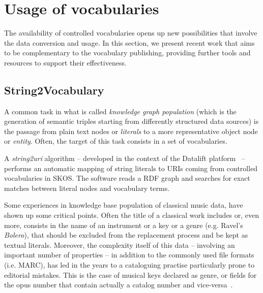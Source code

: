 \documentclass{article}
\begin{document}
\section{Usage of vocabularies}\label{sec:usage}
The availability of controlled vocabularies opens up new possibilities that involve the data conversion and usage. In this section, we present recent work that aims to be complementary to the vocabulary publishing, providing further tools and resources to support their effectiveness.

\subsection{String2Vocabulary}
A common task in what is called \textit{knowledge graph population} (which is the generation of semantic triples starting from differently structured data sources) is the passage from plain text nodes or \textit{literals} to a more representative object node or \textit{entity}. Often, the target of this task consists in a set of vocabularies.

A \textit{string2uri} algorithm -- developed in the context of the Datalift platform~\cite{scharffe2012enabling} -- performs an automatic mapping of string literals to URIs coming from controlled vocabularies in SKOS. The software reads a RDF graph and searches for exact matches between literal nodes and vocabulary terms.

Some experiences in knowledge base population of classical music data, have shown up some critical points. Often the title of a classical work includes or, even more, consists in the name of an instrument or a key or a genre (e.g. Ravel's \textit{Bolero}), that should be excluded from the replacement process and be kept as textual literals. Moreover, the complexity itself of this data -- involving an important number of properties -- in addition to the commonly used file formats (i.e. MARC), has led in the years to a cataloguing practise particularly prone to editorial mistakes. This is the case of musical keys declared as genre, or fields for the opus number that contain actually a catalog number and vice-versa~\cite{lisena2017modeling}.
\end{document}
